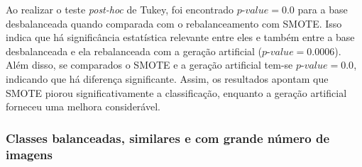 
Ao realizar o teste \textit{post-hoc} de Tukey, foi encontrado $\textit{p-value} = 0.0$ para a base desbalanceada quando comparada com o rebalanceamento com SMOTE. Isso indica que há significância estatística relevante entre eles e também entre a base desbalanceada e ela rebalanceada com a geração artificial ($\textit{p-value} = 0.0006$). Além disso, se comparados o SMOTE e a geração artificial tem-se $\textit{p-value} = 0.0$, indicando que há diferença significante. Assim, os resultados apontam que SMOTE piorou significativamente a classificação, enquanto a geração artificial forneceu uma melhora considerável.

\subsubsection{Classes balanceadas, similares e com grande número de imagens}


